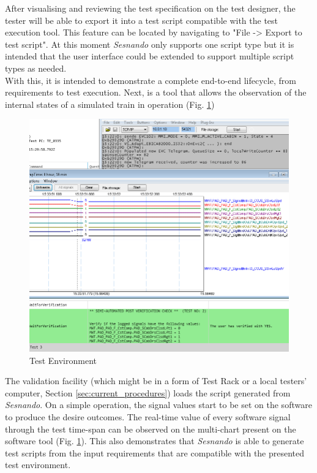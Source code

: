 After visualising and reviewing the test specification on the test designer, the tester will be able to export it into a test script compatible with the test execution tool. This feature can be located by navigating to "File -> Export to test script". At this moment \textit{Sesnando} only supports one script type but it is intended that the user interface could be extended to support multiple script types as needed.\\
With this, it is intended to demonstrate a complete end-to-end lifecycle, from requirements to test execution. Next, is a tool that allows the observation of the internal states of a simulated train in operation (Fig. \ref{fig:test_environment})

\begin{figure}[H]
    \centering
    \includegraphics[width=\textwidth]{images/test_environment.png}
    \caption{Test Environment}
    \label{fig:test_environment}
\end{figure}

The validation facility (which might be in a form of Test Rack or a local testers' computer, Section \ref{sec:current_procedures}) loads the script generated from \textit{Sesnando}. On a simple operation, the signal values start to be set on the software to produce the desire outcomes. The real-time value of every software signal through the test time-span can be observed on the multi-chart present on the software tool (Fig. \ref{fig:test_environment}). This also demonstrates that \textit{Sesnando} is able to generate test scripts from the input requirements that are compatible with the presented test environment.




